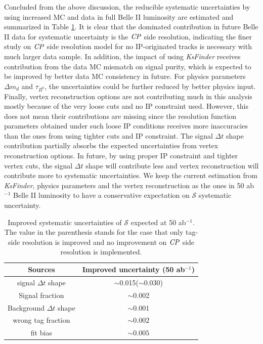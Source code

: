 Concluded from the above discussion, the reducible systematic uncertainties by using increased MC and data in full Belle II luminosity are estimated and summarized in Table \ref{tab:reducedsys}. It is clear that the dominated contribution in future Belle II data for systematic uncertainty is the $\it{CP}$ side resolution, indicating the finer study on $\it{CP}$ side resolution model for no IP-originated tracks is necessary with much larger data sample.
In addition, the impact of using \textit{KsFinder} receives contribution from the data MC mismatch on signal purity, which is expected to be improved by better data MC consistency in future. For physics parameters $\Delta m_d$ and $\tau_{B^0}$, the uncertainties could be further reduced by better physics input. Finally, vertex reconstruction options are not contributing much in this analysis mostly because of the very loose cuts and no IP constraint used. However, this does not mean their contributions are missing since the resolution function parameters obtained under such loose IP conditions receives more inaccuracies than the ones from using tighter cuts and IP constraint. The signal $\Delta t$ shape contribution partially absorbs the expected uncertainties from vertex reconstruction options. In future, by using proper IP constraint and tighter vertex cuts, the signal $\Delta t$ shape will contribute less and vertex reconstruction will contribute more to systematic uncertainties. We keep the current estimation from \textit{KsFinder}, physics parameters and the vertex reconstruction as the ones in 50 ab$^{-1}$ Belle II luminosity to have a conservative expectation on $\mathcal{S}$ systematic uncertainty.

\begin{table}[htpb]
	\centering
	\caption{ Improved systematic uncertainties of $\mathcal{S}$ expected at 50 ab$^{-1}$. The value in the parenthesis stands for the case that only tag-side resolution is improved and no improvement on $\it{CP}$ side resolution is implemented. }
	\label{tab:reducedsys}
	\begin{tabular}{c| c}
		\hline
		Sources & Improved uncertainty (50 ab$^{-1}$) \\
		\hline
		signal $\Delta t$ shape &  $\sim$0.015($\sim$0.030)\\
		Signal fraction &  $\sim$0.002 \\
		Background $\Delta t$ shape &  $\sim0.001$\\
		wrong tag fraction &  $\sim0.002$\\
		fit bias &  $\sim0.005$\\
		\hline
	\end{tabular}
\end{table}


